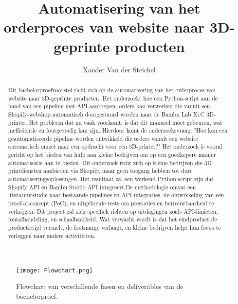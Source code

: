 \documentclass{hogent-article}
\title{Automatisering van het orderproces van website naar 3D-geprinte producten}
\author{Xander Van der Steichel}
\begin{document}
\begin{abstract}
    Dit bachelorproefvoorstel richt zich op de automatisering van het orderproces van website naar 3D-geprinte producten. Het onderzoekt hoe een Python-script aan de hand van een pipeline met API-aanroepen, orders kan verwerken die vanuit een Shopify-webshop automatisch doorgestuurd worden naar de Bambu Lab X1C 3D-printer. Het probleem dat nu vaak voorkomt, is dat dit manueel moet gebeuren, wat inefficiëntie en foutgevoelig kan zijn. Hierdoor komt de onderzoeksvraag: "Hoe kan een geautomatiseerde pipeline worden ontwikkeld die orders vanuit een website automatisch omzet naar een opdracht voor een 3D-printer?" Het onderzoek is vooral gericht op het bieden van hulp aan kleine bedrijven om op een goedkopere manier automatisatie aan te bieden. Dit onderzoek richt zich op kleine bedrijven die 3D-printdiensten aanbieden via Shopify, maar geen toegang hebben tot dure automatiseringsoplossingen. Het resultaat zal een werkend Python-script zijn dat Shopify API en Bambu Studio API integreert.De methodologie omvat een literatuurstudie naar bestaande pipelines en API-integraties, de ontwikkeling van een proof-of-concept (PoC), en uitgebreide tests om prestaties en betrouwbaarheid te verkrijgen. Dit project zal zich specifiek richten op uitdagingen zoals API-limieten, foutafhandeling, en schaalbaarheid. Wat verwacht wordt is dat het eindproduct de productietijd versnelt, de foutmarge verlaagt, en kleine bedrijven helpt hun focus te verleggen naar andere activiteiten.
 
\end{abstract}




\tableofcontents



\printbibliography[heading=bibintoc]


\begin{figure}[H]  %
    \centering
    \texttt{[image: Flowchart.png]}  %
    \caption{Flowchart van verschillende fasen en deliverables van de bachelorproef.}
    \label{fig:flowchart}  %
\end{figure}
\end{document}
